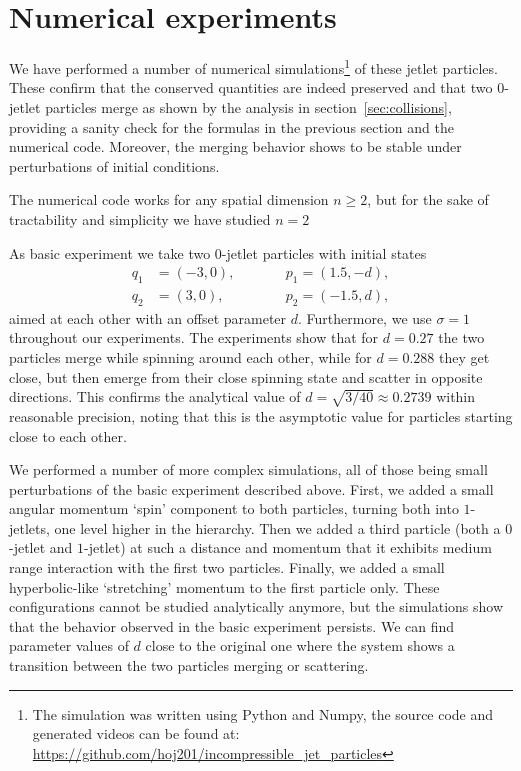 \documentclass[12pt]{amsart}
\begin{document}
\section{Numerical experiments}
\label{sec:Numerical experiments}

We have performed a number of numerical simulations\footnote{%
  The simulation was written using Python and Numpy, the source code
  and generated videos can be found at:
  \url{https://github.com/hoj201/incompressible_jet_particles}%
} of these jetlet particles. These confirm that the conserved
quantities are indeed preserved and that two $0$-jetlet particles
merge as shown by the analysis in section~\ref{sec:collisions},
providing a sanity check for the formulas in the previous section and
the numerical code. Moreover, the merging behavior shows to be stable
under perturbations of initial conditions.

The numerical code works for any spatial dimension $n \ge 2$, but for
the sake of tractability and simplicity we have studied $n = 2$ 

As basic experiment we take two $0$-jetlet particles with initial
states
\begin{equation}\label{eq:exp1-initial}
  \begin{alignedat}{2}
    q_1 &= (-3, 0), &\qquad& p_1 = ( 1.5,-d), \\
    q_2 &= ( 3, 0), &      & p_2 = (-1.5, d),
  \end{alignedat}
\end{equation}
aimed at each other with an offset parameter $d$. Furthermore, we use
$\sigma = 1$ throughout our experiments. The experiments show that for
$d = 0.27$ the two particles merge while spinning around each other,
while for $d = 0.288$ they get close, but then emerge from their close
spinning state and scatter in opposite directions. This confirms the
analytical value of $d = \sqrt{3/40} \approx 0.2739$ within reasonable
precision, noting that this is the asymptotic value for particles
starting close to each other.

We performed a number of more complex simulations, all of
those being small perturbations of the basic experiment described
above. First, we added a small angular momentum `spin' component to
both particles, turning both into $1$-jetlets, one level higher in the
hierarchy. Then we added a third particle (both a $0$-jetlet and
$1$-jetlet) at such a distance and momentum that it exhibits medium
range interaction with the first two particles. Finally, we added a
small hyperbolic-like `stretching' momentum to the first particle
only. These configurations cannot be studied analytically anymore, but
the simulations show that the behavior observed in the basic
experiment persists. We can find parameter values of $d$ close to the
original one where the system shows a transition between the two
particles merging or scattering.
\end{document}
